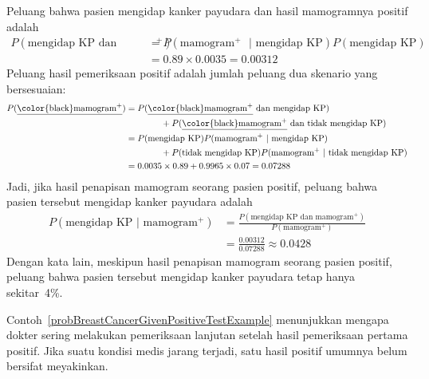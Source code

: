\begin{examplewrap}
\begin{nexample}
\begin{center}
\end{center}
Peluang bahwa pasien mengidap kanker payudara
dan hasil mamogramnya positif adalah
\begin{align*}
P(\text{mengidap KP dan mamogram$^+$}) &= P(\text{mamogram$^+$ } | \text{ mengidap KP})P(\text{mengidap KP}) \\
	&= 0.89\times 0.0035 = 0.00312
\end{align*}
Peluang hasil pemeriksaan positif adalah jumlah peluang dua skenario yang bersesuaian:
\begin{align*}
P(\text{\underline{\color{black}mamogram$^+$}})
  &= P(\text{\underline{\color{black}mamogram$^+$} dan mengidap KP}) \\
  &\qquad\qquad
      + P(\text{\underline{\color{black}mamogram$^+$} dan tidak mengidap KP})\\
  &= P(\text{mengidap KP})P(\text{mamogram$^+$ } | \text{ mengidap KP}) \\
  &\qquad\qquad
      + P(\text{tidak mengidap KP})P(\text{mamogram$^+$ } | \text{ tidak mengidap KP}) \\
  &= 0.0035\times 0.89 + 0.9965\times 0.07 = 0.07288
\end{align*}
Jadi, jika hasil penapisan mamogram seorang pasien positif, peluang bahwa pasien tersebut mengidap kanker payudara adalah
\begin{align*}
P(\text{mengidap KP } | \text{ mamogram$^+$})
	&= \frac{P(\text{mengidap KP dan mamogram$^+$})}{P(\text{mamogram$^+$})}\\
	&= \frac{0.00312}{0.07288} \approx 0.0428
\end{align*}
Dengan kata lain, meskipun hasil penapisan mamogram seorang pasien positif, peluang bahwa pasien tersebut mengidap kanker payudara tetap hanya sekitar~4\%.
\end{nexample}
\end{examplewrap}


\D{\newpage}

Contoh~\ref{probBreastCancerGivenPositiveTestExample} menunjukkan mengapa dokter sering melakukan pemeriksaan lanjutan setelah hasil pemeriksaan pertama positif. Jika suatu kondisi medis jarang terjadi, satu hasil positif umumnya belum bersifat meyakinkan.


